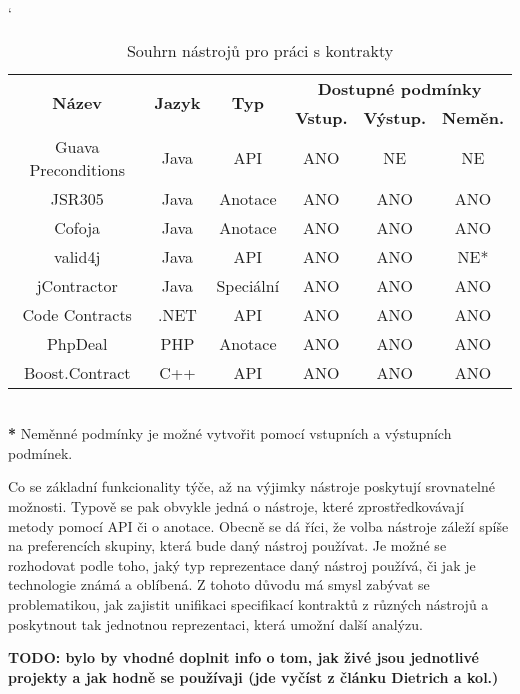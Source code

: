 		\begin{table}[H]
		\catcode`
		\begin{tabular}{|c||c|c|c|c|c|}
			\hline
			\multirow{2}{*}{\bf Název} & \multirow{2}{*}{\bf Jazyk} & \multirow{2}{*}{\bf Typ} & \multicolumn{3}{c|}{\bf Dostupné podmínky}\\
				\cline{4-6}
					& & & {\bf Vstup.} & {\bf Výstup.} & {\bf Neměn.}\\
				\hline
				\hline
					  Guava Preconditions & Java & API & ANO & NE & NE\\
					  JSR305 & Java & Anotace & ANO & ANO & ANO\\
					  Cofoja & Java & Anotace & ANO & ANO & ANO\\
					  valid4j & Java & API & ANO & ANO & NE*\\
					  jContractor & Java & Speciální & ANO & ANO & ANO\\
					  Code Contracts & .NET & API & ANO & ANO & ANO\\
					  PhpDeal & PHP & Anotace & ANO & ANO & ANO\\					  
					  Boost.Contract & C++ & API & ANO & ANO & ANO\\
				\hline
		\end{tabular}\\
		
		\footnotesize
			\- \- \- \textbf{*} Neměnné podmínky je možné vytvořit pomocí vstupních a výstupních podmínek.
					
		\caption{Souhrn nástrojů pro práci s kontrakty}
		\label{table:tabContracts}
		\end{table}		
		
		\normalsize	
			
		Co se základní funkcionality týče, až na výjimky nástroje poskytují srovnatelné možnosti. Typově se pak obvykle jedná o nástroje, které zprostředkovávají metody pomocí API či o anotace. Obecně se dá říci, že volba nástroje záleží spíše na preferencích skupiny, která bude daný nástroj používat. Je možné se rozhodovat podle toho, jaký typ reprezentace daný nástroj používá, či jak je technologie známá a oblíbená. Z tohoto důvodu má smysl zabývat se problematikou, jak zajistit unifikaci specifikací kontraktů z různých nástrojů a poskytnout tak jednotnou reprezentaci, která umožní další analýzu. 
		
		\textbf{\textcolor{pblue}{TODO: bylo by vhodné doplnit info o tom, jak živé jsou jednotlivé projekty a jak hodně se používaji (jde vyčíst z článku Dietrich a kol.)}}\\